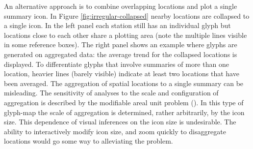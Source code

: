 \documentclass[oneside]{article}
\begin{document}
An alternative approach is to combine overlapping locations and plot a single summary icon.  In Figure \ref{fig:irregular-collapsed} nearby locations are collapsed to a single icon.  In the left panel each station still has an individual glyph but locations close to each other share a plotting area (note the multiple lines visible in some reference boxes). The right panel shows an example where glyphs are generated on aggregated data: the average trend for the collapsed locations is displayed.  To differentiate glyphs that involve summaries of more than one location, heavier lines (barely visible) indicate at least two locations that have been averaged.  The aggregation of spatial locations to a single summary can be misleading.  The sensitivity of analyses to the scale and configuration of aggregation is described by the  modifiable areal unit problem (\cite{Openshaw:1984kx, Fotheringham:1991uq}). In this type of glyph-map the scale of aggregation is determined, rather arbitrarily, by the icon size. This dependence of visual inferences on the icon size is undesirable.  The ability to interactively modify icon size, and zoom quickly to disaggregate locations would go some way to alleviating the problem.
\end{document}
